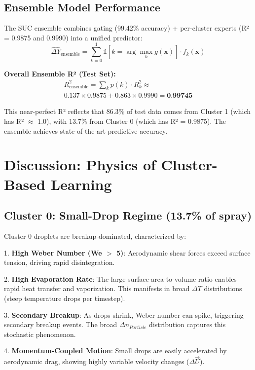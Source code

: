 \documentclass[letterpaper,twocolumn,10pt]{article}
\begin{document}
\subsection{Ensemble Model Performance}

The SUC ensemble combines gating (99.42\% accuracy) + per-cluster experts (R² = 0.9875 and 0.9990) into a unified predictor:
\begin{equation}
\hat{\Delta Y}_{\text{ensemble}} = \sum_{k=0}^{1} \mathbb{1}[k = \arg\max_k g(\mathbf{x})] \cdot f_k(\mathbf{x})
\end{equation}

\textbf{Overall Ensemble R² (Test Set):}
\begin{multline*}
R^2_{\text{ensemble}} = \sum_{k} p(k) \cdot R^2_k \approx \\
0.137 \times 0.9875 + 0.863 \times 0.9990 = \textbf{0.99745}
\end{multline*}

This near-perfect R² reflects that 86.3\% of test data comes from Cluster 1 (which has R² $\approx$ 1.0), with 13.7\% from Cluster 0 (which has R² = 0.9875). The ensemble achieves state-of-the-art predictive accuracy.

\section{Discussion: Physics of Cluster-Based Learning}

\subsection{Cluster 0: Small-Drop Regime (13.7\% of spray)}

Cluster 0 droplets are breakup-dominated, characterized by:

1. \textbf{High Weber Number (We $>$ 5)}: Aerodynamic shear forces exceed surface tension, driving rapid disintegration.

2. \textbf{High Evaporation Rate}: The large surface-area-to-volume ratio enables rapid heat transfer and vaporization. This manifests in broad $\Delta T$ distributions (steep temperature drops per timestep).

3. \textbf{Secondary Breakup}: As drops shrink, Weber number can spike, triggering secondary breakup events. The broad $\Delta n_{Particle}$ distribution captures this stochastic phenomenon.

4. \textbf{Momentum-Coupled Motion}: Small drops are easily accelerated by aerodynamic drag, showing highly variable velocity changes ($\Delta \vec{U}$).
\end{document}
